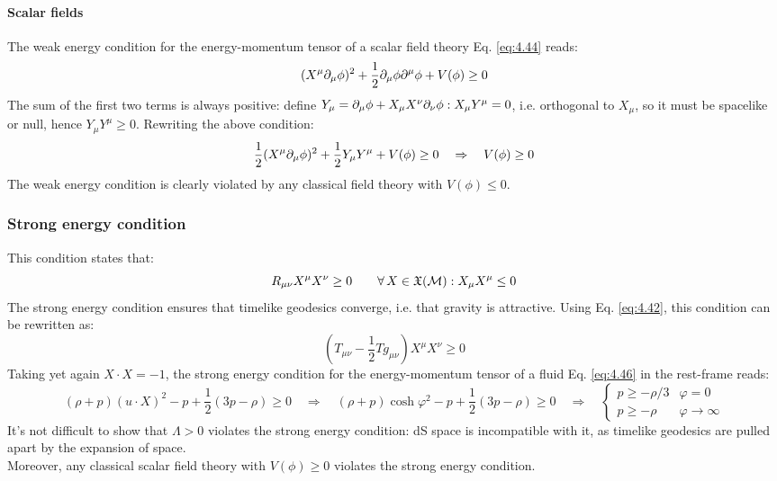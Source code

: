 \paragraph{Scalar fields}

The weak energy condition for the energy-momentum tensor of a scalar field theory Eq. \ref{eq:4.44} reads:
\begin{equation*}
  (X^\mu \partial_\mu \phi)^2 + \frac{1}{2} \partial_\mu \phi \partial^\mu \phi + V(\phi) \ge 0
\end{equation*}
The sum of the first two terms is always positive: define $ Y_\mu = \partial_\mu \phi + X_\mu X^\nu \partial_\nu \phi : X_\mu Y^\mu = 0 $, i.e. orthogonal to $ X_\mu $, so it must be spacelike or null, hence $ Y_\mu Y^\mu \ge 0 $. Rewriting the above condition:
\begin{equation*}
  \frac{1}{2} (X^\mu \partial_\mu \phi)^2 + \frac{1}{2} Y_\mu Y^\mu + V(\phi) \ge 0
  \quad \Rightarrow \quad
  V(\phi) \ge 0
\end{equation*}
The weak energy condition is clearly violated by any classical field theory with $ V(\phi) \le 0 $.

\subsubsection{Strong energy condition}

This condition states that:
\begin{equation}
  R_{\mu \nu} X^\mu X^\nu \ge 0
  \qquad
  \forall\, X \in \mathfrak{X}(\mathcal{M}) : X_\mu X^\mu \le 0
  \label{eq:4.53}
\end{equation}
The strong energy condition ensures that timelike geodesics converge, i.e. that gravity is attractive. Using Eq. \ref{eq:4.42}, this condition can be rewritten as:
\begin{equation*}
  \left( T_{\mu \nu} - \frac{1}{2} T g_{\mu \nu} \right) X^\mu X^\nu \ge 0
\end{equation*}
Taking yet again $ X \cdot X = -1 $, the strong energy condition for the energy-momentum tensor of a fluid Eq. \ref{eq:4.46} in the rest-frame reads:
\begin{equation*}
  (\rho + p) (u \cdot X)^2 - p + \frac{1}{2} (3p - \rho) \ge 0
  \quad \Rightarrow \quad
  (\rho + p) \cosh \varphi^2 - p + \frac{1}{2} (3p - \rho) \ge 0
  \quad \Rightarrow \quad
  \begin{cases}
    p \ge -\rho/3 & \varphi = 0 \\
    p \ge -\rho & \varphi \rightarrow \infty
  \end{cases}
\end{equation*}
It's not difficult to show that $ \Lambda > 0 $ violates the strong energy condition: dS space is incompatible with it, as timelike geodesics are pulled apart by the expansion of space.\\
Moreover, any classical scalar field theory with $ V(\phi) \ge 0 $ violates the strong energy condition.

